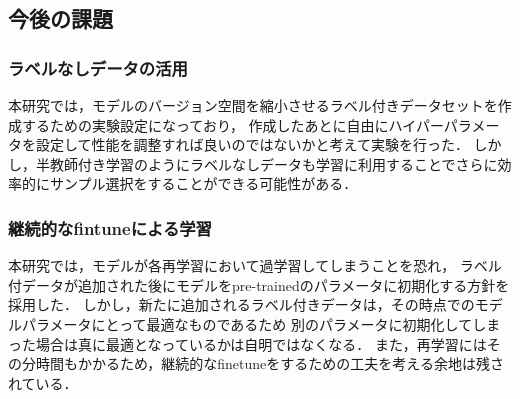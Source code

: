\subsection{今後の課題}

\subsubsection{ラベルなしデータの活用}
本研究では，モデルのバージョン空間を縮小させるラベル付きデータセットを作成するための実験設定になっており，
作成したあとに自由にハイパーパラメータを設定して性能を調整すれば良いのではないかと考えて実験を行った．
しかし，半教師付き学習のようにラベルなしデータも学習に利用することでさらに効率的にサンプル選択をすることができる可能性がある．

\subsubsection{継続的なfintuneによる学習}
本研究では，モデルが各再学習において過学習してしまうことを恐れ，
ラベル付データが追加された後にモデルをpre-trainedのパラメータに初期化する方針を採用した．
しかし，新たに追加されるラベル付きデータは，その時点でのモデルパラメータにとって最適なものであるため
別のパラメータに初期化してしまった場合は真に最適となっているかは自明ではなくなる．
また，再学習にはその分時間もかかるため，継続的なfinetuneをするための工夫を考える余地は残されている．
